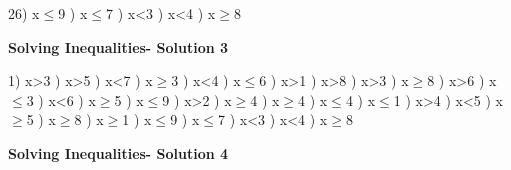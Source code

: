 \documentclass{article}%
\begin{document}
26) x$\leq$9%
) x$\leq$7%
) x<3%
) x<4%
) x$\geq$8%
\newline%
\newpage%
\large%
\begin{center}%
\textbf{Solving Inequalities- Solution 3}%
\newline%
\end{center} \normalsize%
1) x>3%
) x>5%
) x<7%
) x$\geq$3%
) x<4%
) x$\leq$6%
) x>1%
) x>8%
) x>3%
) x$\geq$8%
) x>6%
) x$\leq$3%
) x<6%
) x$\geq$5%
) x$\leq$9%
) x>2%
) x$\geq$4%
) x$\geq$4%
) x$\leq$4%
) x$\leq$1%
) x>4%
) x<5%
) x$\geq$5%
) x$\geq$8%
) x$\geq$1%
) x$\leq$9%
) x$\leq$7%
) x<3%
) x<4%
) x$\geq$8%
\newline%
\newpage%
\large%
\begin{center}%
\textbf{Solving Inequalities- Solution 4}%
\newline%
\end{center} \normalsize%
\end{document}
